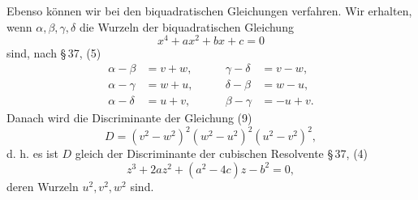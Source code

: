 \documentclass[11pt]{article}
\begin{document}
Ebenso können wir bei den biquadratischen Gleichungen verfahren. Wir erhalten, wenn $\alpha,\beta,\gamma,\delta$ die Wurzeln der biquadratischen Gleichung
\begin{equation}
x^4+ax^2+bx+c=0
\tag{9}
\end{equation}
sind, nach \S\,37, (5)
\begin{equation}
\begin{alignedat}{2}
\alpha-\beta&=v+w,          &\qquad \gamma-\delta&=v-w,\\
\alpha-\gamma&=w+u,         &\qquad \delta-\beta&=w-u,\\
\alpha-\delta&=u+v,         &\qquad \beta-\gamma&=-u+v.
\end{alignedat}
\tag{10}
\end{equation}
Danach wird die Discriminante der Gleichung (9)
\[
D=(v^2-w^2)^2(w^2-u^2)^2(u^2-v^2)^2,
\]
d. h. es ist $D$ gleich der Discriminante der cubischen Resolvente \S\,37, (4)
\begin{equation}
z^3+2az^2+(a^2-4c)z-b^2=0,
\tag{11}
\end{equation}
deren Wurzeln $u^2,v^2,w^2$ sind.
\end{document}
